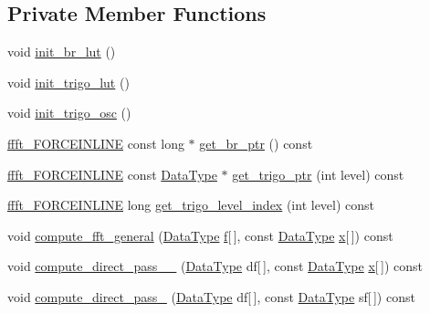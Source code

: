 \subsection*{Private Member Functions}
\begin{DoxyCompactItemize}
\item 
void \hyperlink{classffft_1_1FFTReal_aa7315c1c287185277a8188eb4c6180c8}{init\+\_\+br\+\_\+lut} ()
\item 
void \hyperlink{classffft_1_1FFTReal_aac5c6c408da94a9d346e97aeded61ef2}{init\+\_\+trigo\+\_\+lut} ()
\item 
void \hyperlink{classffft_1_1FFTReal_adcac1258791df06ea6597c7f4fc49f63}{init\+\_\+trigo\+\_\+osc} ()
\item 
\hyperlink{def_8h_a31b2ada863c9efa7455efae4e13661f3}{ffft\+\_\+\+F\+O\+R\+C\+E\+I\+N\+L\+I\+NE} const long $\ast$ \hyperlink{classffft_1_1FFTReal_ae8bd596a64bbc6ff19a1b7efe0da50bc}{get\+\_\+br\+\_\+ptr} () const 
\item 
\hyperlink{def_8h_a31b2ada863c9efa7455efae4e13661f3}{ffft\+\_\+\+F\+O\+R\+C\+E\+I\+N\+L\+I\+NE} const \hyperlink{classffft_1_1FFTReal_a606148f1cf8c3b7d705473932fc063d1}{Data\+Type} $\ast$ \hyperlink{classffft_1_1FFTReal_a9683286954e4f26259af2c0f5c8727cb}{get\+\_\+trigo\+\_\+ptr} (int level) const 
\item 
\hyperlink{def_8h_a31b2ada863c9efa7455efae4e13661f3}{ffft\+\_\+\+F\+O\+R\+C\+E\+I\+N\+L\+I\+NE} long \hyperlink{classffft_1_1FFTReal_ae99a3872cc7dafca94190ee0d0e50fec}{get\+\_\+trigo\+\_\+level\+\_\+index} (int level) const 
\item 
void \hyperlink{classffft_1_1FFTReal_afdaf4c3d2ccb9fffcaa7d686179dd9ff}{compute\+\_\+fft\+\_\+general} (\hyperlink{classffft_1_1FFTReal_a606148f1cf8c3b7d705473932fc063d1}{Data\+Type} \hyperlink{FFTReal__readme_8txt_abbf3cc73d1e3e4714ab1639819396eca}{f}\mbox{[}$\,$\mbox{]}, const \hyperlink{classffft_1_1FFTReal_a606148f1cf8c3b7d705473932fc063d1}{Data\+Type} \hyperlink{FFTReal__readme_8txt_a9c92ac89d1560f812393ca39a19e581e}{x}\mbox{[}$\,$\mbox{]}) const 
\item 
void \hyperlink{classffft_1_1FFTReal_ac68be02ec38a22046a95a9b844da25db}{compute\+\_\+direct\+\_\+pass\+\_\+\_} (\hyperlink{classffft_1_1FFTReal_a606148f1cf8c3b7d705473932fc063d1}{Data\+Type} df\mbox{[}$\,$\mbox{]}, const \hyperlink{classffft_1_1FFTReal_a606148f1cf8c3b7d705473932fc063d1}{Data\+Type} \hyperlink{FFTReal__readme_8txt_a9c92ac89d1560f812393ca39a19e581e}{x}\mbox{[}$\,$\mbox{]}) const 
\item 
void \hyperlink{classffft_1_1FFTReal_a56b30d8e3cc4b343ea59cdaa54f326cd}{compute\+\_\+direct\+\_\+pass\+\_} (\hyperlink{classffft_1_1FFTReal_a606148f1cf8c3b7d705473932fc063d1}{Data\+Type} df\mbox{[}$\,$\mbox{]}, const \hyperlink{classffft_1_1FFTReal_a606148f1cf8c3b7d705473932fc063d1}{Data\+Type} sf\mbox{[}$\,$\mbox{]}) const 

\end{DoxyCompactItemize}
